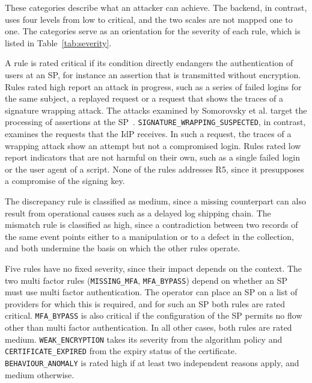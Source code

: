 \documentclass[../main.tex]{subfiles}
\begin{document}
These categories describe what an attacker can achieve. 
The backend, in contrast, uses four levels from low to critical, and the two scales are not mapped 
one to one. 
The categories serve as an orientation for the severity of each rule, which is listed in 
Table~\ref{tab:severity}. 

A rule is rated critical if its condition directly endangers the authentication of users at an SP, 
for instance an assertion that is transmitted without encryption. 
Rules rated high report an attack in progress, such as a series of failed logins for the same 
subject, a replayed request or a request that shows the traces of a signature wrapping attack. 
The attacks examined by Somorovsky et al. target the processing of assertions at the 
SP~\cite{BreakingSAML}. 
\texttt{SIGNATURE\_\allowbreak{}WRAPPING\_\allowbreak{}SUSPECTED}, in contrast, examines the 
requests that the IdP receives. 
In such a request, the traces of a wrapping attack show an attempt but not a compromised login. 
Rules rated low report indicators that are not harmful on their own, such as a single failed login 
or the user agent of a script. 
None of the rules addresses R5, since it presupposes a compromise of the signing key. 

The discrepancy rule is classified as medium, since a missing counterpart can also result from 
operational causes such as a delayed log shipping chain. 
The mismatch rule is classified as high, since a contradiction between two records of the same 
event points either to a manipulation or to a defect in the collection, and both undermine the 
basis on which the other rules operate.

Five rules have no fixed severity, since their impact depends on the context. 
The two multi factor rules (\texttt{MISSING\_MFA}, \texttt{MFA\_BYPASS}) depend on whether an SP 
must use multi factor authentication. 
The operator can place an SP on a list of providers for which this is required, and for such an 
SP both rules are rated critical. 
\texttt{MFA\_\allowbreak{}BYPASS} is also critical if the configuration of the SP permits no 
flow other than multi factor authentication. 
In all other cases, both rules are rated medium. 
\texttt{WEAK\_\allowbreak{}ENCRYPTION} takes its severity from the algorithm policy and 
\texttt{CERTIFICATE\_\allowbreak{}EXPIRED} from the expiry status of the certificate. 
\texttt{BEHAVIOUR\_\allowbreak{}ANOMALY} is rated high if at least two independent reasons apply, 
and medium otherwise. 
\end{document}
